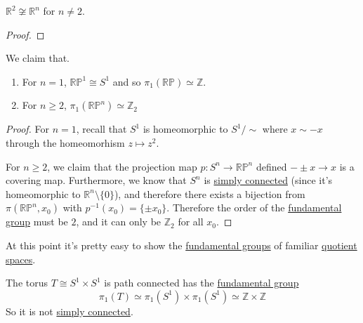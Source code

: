 	\begin{corollary}
	  \label{thm:r2notcongrn}
		$\mathbb{R}^2 \not\cong \mathbb{R}^n$ for $n \neq 2$. 
	\end{corollary}
	\begin{proof}
	  
	\end{proof}

  \begin{theorem}
    \label{thm:fundamental-groups-of-rpn}
    We claim that. 
    \begin{enumerate}
      \item For $n = 1$, $\mathbb{RP}^1 \cong S^1$ and so $\pi_1(\mathbb{RP}) \simeq \mathbb{Z}$. 
      \item For $n \geq 2$, $\pi_1 (\mathbb{RP}^n) \simeq \mathbb{Z}_2$
    \end{enumerate}
  \end{theorem}
  \begin{proof}
    For $n = 1$, recall that $S^1$ is homeomorphic to $S^1/{\sim}$ where $x \sim -x$ through the homeomorhism $z \mapsto z^2$. 

    For $n \geq 2$, we claim that the projection map $p: S^n \to \mathbb{RP}^n$ defined $-\pm x \to x$ is a covering map. Furthermore, we know that $S^n$ is \hyperref[def:simply-connected]{simply connected} (since it's homeomorphic to $\mathbb{R}^n \setminus \{0\}$), and therefore there exists a bijection from $\pi(\mathbb{RP}^n, x_0)$ with $p^{-1} (x_0) = \{\pm x_0\}$. Therefore the order of the \hyperref[def:fundamental-group]{fundamental group} must be $2$, and it can only be $\mathbb{Z}_2$ for all $x_0$. 
  \end{proof}

  At this point it's pretty easy to show the \hyperref[def:fundamental-group]{fundamental groups} of familiar \hyperref[pst-thm:quotient-spaces]{quotient spaces}. 

  \begin{example}[Torus]
    \label{ex:torus}
    The torus $T \cong S^1 \times S^1$ is path connected has the \hyperref[def:fundamental-group]{fundamental group} 
    \begin{equation}
      \pi_1 (T) \simeq \pi_1 (S^1) \times \pi_1 (S^1) \simeq \mathbb{Z} \times \mathbb{Z}
    \end{equation}
    So it is not \hyperref[def:simply-connected]{simply connected}. 
  \end{example}

